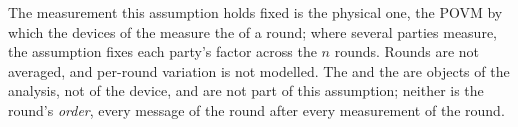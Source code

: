 
The measurement this assumption holds fixed is the physical one, the POVM by
which the devices of the  measure the  of a round; where several parties measure, the assumption fixes each
party's factor across the $n$ rounds. Rounds are not averaged, and per-round
variation is not modelled. The  and the
 are objects of the analysis, not of the device, and
are not part of this assumption; neither is the round's \emph{order}, every
message of the round after every measurement of the round.

